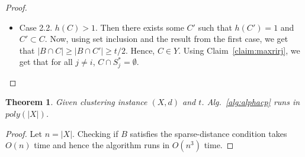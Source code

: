 \documentclass[12pt]{article}
\newtheorem{theorem}{Theorem}
\begin{document}
\begin{proof}
\begin{itemize}[nolistsep,leftmargin=*]
\begin{itemize}[leftmargin=*]
\item Case 2.2. $h(C) > 1$. Then there exists some $C'$ such that $h(C') = 1$ and $C' \subset C$. Now, using set inclusion and the result from the first case, we get that $|B\cap C| \ge |B\cap C'| \ge t/2$. Hence, $C \in Y$. Using Claim~\ref{claim:maxrirj}, we get that for all $j \neq i$, $C \cap S_j^* = \emptyset$.
\end{itemize} 
\end{itemize}
\end{proof}

\begin{theorem}
\label{thm:algcptime}
Given clustering instance $(X, d)$ and $t$. Alg.~\ref{alg:alphacp} runs in  $poly(|X|)$.
\end{theorem}

\begin{proof}
Let $n = |X|$. Checking if $B$ satisfies the sparse-distance condition takes $O(n)$ time and hence the algorithm runs in $O(n^3)$ time.
\end{proof}
\end{document}
